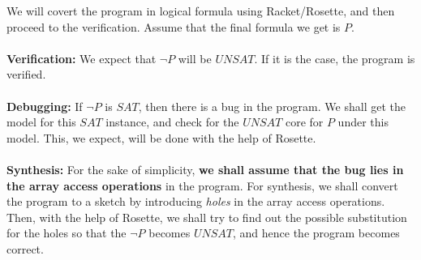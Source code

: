 \documentclass[a4paper, 12pt, notitlepage] {article}
\newcommand{\hide}[1]{}
\begin{document}
We will covert the program in logical formula using Racket/Rosette, and then proceed to the verification. Assume that the final formula we get is $P$.\\\\
\hide{
\\
\begin{equation}
\begin{split}
  &P \coloneqq (\\
  &(a_i = a[i] \land a_j = a[j]) \\
&\land (a[i] > a[j] \implies t = a[i]\\
& \land a' = a\{i \leftarrow a[j]\})  \\
& \land a'' = a'\{j \leftarrow t\}\\
&) \\
&\implies ((a_i > a_j \implies a[i] = a_j \land a[j] = a_i)\\
&\land (\neg (a_i > a_j) \implies a[i] = a_i \land a[j] = a_j))
\end{split}
\end{equation}
}
{\bf Verification:} We expect that $\neg P$ will be $UNSAT$. If it is the case, the program is verified.
\\\\
{\bf Debugging:} If $\neg P$ is $SAT$, then there is a bug in the program. We shall get the model for this $SAT$ instance, and check for the $UNSAT$ core for $P$ under this model. This, we expect, will be done with the help of Rosette. \\
\\
{\bf Synthesis:} For the sake of simplicity, {\bf we shall assume that the bug lies in the array access operations} in the program. For synthesis, we shall convert the program to a sketch by introducing \emph{holes} in the array access operations. Then, with the help of Rosette, we shall try to find out the possible substitution for the holes so that the $\neg P$ becomes $UNSAT$, and hence the program becomes correct. \\
\\
\end{document}
